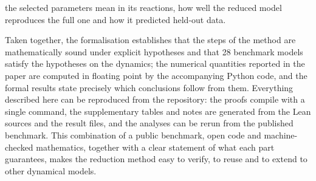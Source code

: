 the selected parameters mean in its reactions, how well the reduced model reproduces the full one and how it predicted held-out data.

Taken together, the formalisation establishes that the steps of the method are mathematically sound under explicit hypotheses and that 28 benchmark models satisfy the hypotheses on the dynamics; the numerical quantities reported in the paper are computed in floating point by the accompanying Python code, and the formal results state precisely which conclusions follow from them. Everything described here can be reproduced from the repository: the proofs compile with a single command, the supplementary tables and notes are generated from the Lean sources and the result files, and the analyses can be rerun from the published benchmark. This combination of a public benchmark, open code and machine-checked mathematics, together with a clear statement of what each part guarantees, makes the reduction method easy to verify, to reuse and to extend to other dynamical models.
